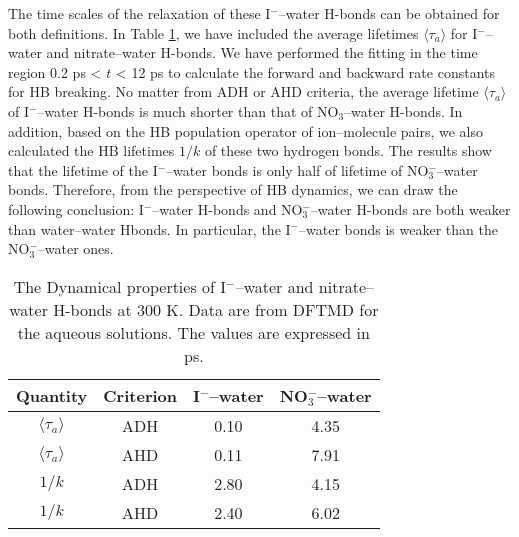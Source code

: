 {The time scales of the relaxation of these I$^-$--water H-bonds can be obtained for both definitions. 
In Table \ref{tab:properties_anion-water_hbs}, we have included the average lifetimes $\langle\tau_{a}\rangle$ for I$^-$--water and nitrate--water H-bonds. 
We have performed the fitting in the time region 0.2 ps < $t$ < 12 ps to calculate the forward and backward rate constants for HB breaking.
No matter from ADH or AHD criteria, the average lifetime $\langle\tau_a\rangle$ of I$^-$--water H-bonds is much shorter than that of NO$_3$--water H-bonds.
In addition, based on the HB population operator of ion--molecule pairs, we also calculated the HB lifetimes $1/k$ of these two hydrogen bonds. 
The results show that the lifetime of the I$^-$--water bonds is only half of lifetime of NO$_3^-$--water bonds. Therefore, from the perspective of HB dynamics,
we can draw the following conclusion: I$^-$--water H-bonds and NO$_3^-$--water H-bonds are both weaker than water--water Hbonds. In particular, 
the I$^-$--water bonds is weaker than the NO$_3^-$--water ones.
\begin{table}[htbp]
\centering
\caption{ 
    The Dynamical properties of I$^-$--water and nitrate--water H-bonds at 300 K. Data are from DFTMD for the aqueous solutions. The values are expressed in ps.} 
\begin{tabular}{cccc}
\label{tab:properties_anion-water_hbs}
 Quantity & Criterion & I$^-$--water & NO$_3^-$--water \\
\hline
  $\langle\tau_a\rangle$  & ADH & 0.10 & 4.35 \\
  $\langle\tau_a\rangle$ & AHD & 0.11 & 7.91 \\
  $1/k$ & ADH & 2.80 & 4.15 \\
  $1/k$ & AHD & 2.40 & 6.02\\
\end{tabular}
\end{table}
%
%

}

